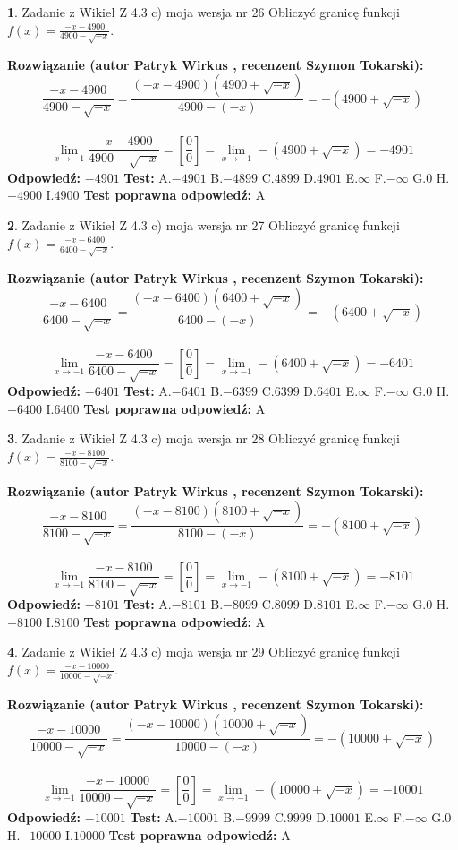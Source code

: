 \documentclass[12pt, a4paper]{article}
\theoremstyle{definition} %
\newtheorem{zad}{}
\newcommand{\zadStart}[1]{\begin{zad}#1\newline}
\newcommand{\zadStop}{\end{zad}}
\newcommand{\rozwStart}[2]{\noindent \textbf{Rozwiązanie (autor #1 , recenzent #2): }\newline}
\newcommand{\rozwStop}{\newline}
\newcommand{\odpStart}{\noindent \textbf{Odpowiedź:}\newline}
\newcommand{\odpStop}{\newline}
\newcommand{\testStart}{\noindent \textbf{Test:}\newline}
\newcommand{\testStop}{\newline}
\newcommand{\kluczStart}{\noindent \textbf{Test poprawna odpowiedź:}\newline}
\newcommand{\kluczStop}{\newline}
\begin{document}
\zadStart{Zadanie z Wikieł Z 4.3 c) moja wersja nr 26}
Obliczyć granicę funkcji $f(x)=\frac{-x-4900}{4900-\sqrt{-x}}$.
\zadStop
\rozwStart{Patryk Wirkus}{Szymon Tokarski}
$$\frac{-x-4900}{4900-\sqrt{-x}}=\frac{(-x-4900)(4900+\sqrt{-x})}{4900-(-x)}=-(4900+\sqrt{-x})$$
\\
$$\lim\limits_{x\to-1}\frac{-x-4900}{4900-\sqrt{-x}}=[\frac{0}{0}]=\lim\limits_{x\to-1}-(4900+\sqrt{-x}) =-4901$$
\rozwStop
\odpStart
$-4901$
\odpStop
\testStart
A.$-4901$
B.$-4899$
C.$4899$
D.$4901$
E.$\infty$
F.$-\infty$
G.$0$
H.$-4900$
I.$4900$
\testStop
\kluczStart
A
\kluczStop



\zadStart{Zadanie z Wikieł Z 4.3 c) moja wersja nr 27}
Obliczyć granicę funkcji $f(x)=\frac{-x-6400}{6400-\sqrt{-x}}$.
\zadStop
\rozwStart{Patryk Wirkus}{Szymon Tokarski}
$$\frac{-x-6400}{6400-\sqrt{-x}}=\frac{(-x-6400)(6400+\sqrt{-x})}{6400-(-x)}=-(6400+\sqrt{-x})$$
\\
$$\lim\limits_{x\to-1}\frac{-x-6400}{6400-\sqrt{-x}}=[\frac{0}{0}]=\lim\limits_{x\to-1}-(6400+\sqrt{-x}) =-6401$$
\rozwStop
\odpStart
$-6401$
\odpStop
\testStart
A.$-6401$
B.$-6399$
C.$6399$
D.$6401$
E.$\infty$
F.$-\infty$
G.$0$
H.$-6400$
I.$6400$
\testStop
\kluczStart
A
\kluczStop



\zadStart{Zadanie z Wikieł Z 4.3 c) moja wersja nr 28}
Obliczyć granicę funkcji $f(x)=\frac{-x-8100}{8100-\sqrt{-x}}$.
\zadStop
\rozwStart{Patryk Wirkus}{Szymon Tokarski}
$$\frac{-x-8100}{8100-\sqrt{-x}}=\frac{(-x-8100)(8100+\sqrt{-x})}{8100-(-x)}=-(8100+\sqrt{-x})$$
\\
$$\lim\limits_{x\to-1}\frac{-x-8100}{8100-\sqrt{-x}}=[\frac{0}{0}]=\lim\limits_{x\to-1}-(8100+\sqrt{-x}) =-8101$$
\rozwStop
\odpStart
$-8101$
\odpStop
\testStart
A.$-8101$
B.$-8099$
C.$8099$
D.$8101$
E.$\infty$
F.$-\infty$
G.$0$
H.$-8100$
I.$8100$
\testStop
\kluczStart
A
\kluczStop



\zadStart{Zadanie z Wikieł Z 4.3 c) moja wersja nr 29}
Obliczyć granicę funkcji $f(x)=\frac{-x-10000}{10000-\sqrt{-x}}$.
\zadStop
\rozwStart{Patryk Wirkus}{Szymon Tokarski}
$$\frac{-x-10000}{10000-\sqrt{-x}}=\frac{(-x-10000)(10000+\sqrt{-x})}{10000-(-x)}=-(10000+\sqrt{-x})$$
\\
$$\lim\limits_{x\to-1}\frac{-x-10000}{10000-\sqrt{-x}}=[\frac{0}{0}]=\lim\limits_{x\to-1}-(10000+\sqrt{-x}) =-10001$$
\rozwStop
\odpStart
$-10001$
\odpStop
\testStart
A.$-10001$
B.$-9999$
C.$9999$
D.$10001$
E.$\infty$
F.$-\infty$
G.$0$
H.$-10000$
I.$10000$
\testStop
\kluczStart
A
\kluczStop
\end{document}
